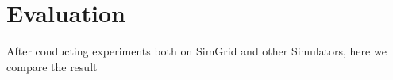 \chapter{Evaluation}
\label{chapter:evaluation}

After conducting experiments both on SimGrid and other Simulators, here we compare the result\\